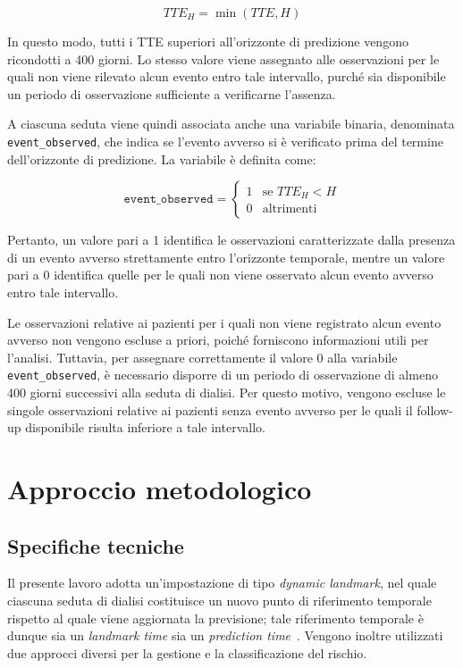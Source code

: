 \documentclass[a4paper,12pt]{report}
\begin{document}
\[
TTE_H = \min(TTE, H)
\]

In questo modo, tutti i TTE superiori all'orizzonte di predizione vengono ricondotti a 400 giorni. Lo stesso valore viene assegnato alle osservazioni per le quali non viene rilevato alcun evento entro tale intervallo, purché sia disponibile un periodo di osservazione sufficiente a verificarne l'assenza.

A ciascuna seduta viene quindi associata anche una variabile binaria, denominata \texttt{event\_observed}, che indica se l'evento avverso si è verificato prima del termine dell'orizzonte di predizione. La variabile è definita come:

\[
\texttt{event\_observed} =
\begin{cases}
1 & \text{se } TTE_H < H\\
0 & \text{altrimenti}
\end{cases}
\]

Pertanto, un valore pari a 1 identifica le osservazioni caratterizzate dalla presenza di un evento avverso strettamente entro l'orizzonte temporale, mentre un valore pari a 0 identifica quelle per le quali non viene osservato alcun evento avverso entro tale intervallo.

Le osservazioni relative ai pazienti per i quali non viene registrato alcun evento avverso non vengono escluse a priori, poiché forniscono informazioni utili per l'analisi. Tuttavia, per assegnare correttamente il valore 0 alla variabile \texttt{event\_observed}, è necessario disporre di un periodo di osservazione di almeno 400 giorni successivi alla seduta di dialisi. Per questo motivo, vengono escluse le singole osservazioni relative ai pazienti senza evento avverso per le quali il follow-up disponibile risulta inferiore a tale intervallo.

\chapter{Approccio metodologico}
\label{cap:metodo}
\section{Specifiche tecniche}

Il presente lavoro adotta un'impostazione di tipo \textit{dynamic landmark}, nel quale ciascuna seduta di dialisi costituisce un nuovo punto di riferimento temporale rispetto al quale viene aggiornata la previsione; tale riferimento temporale è dunque sia un \textit{landmark time} sia un \textit{prediction time}~\cite{VANHOUWELINGENDL2006}. Vengono inoltre utilizzati due approcci diversi per la gestione e la classificazione del rischio.
\end{document}
